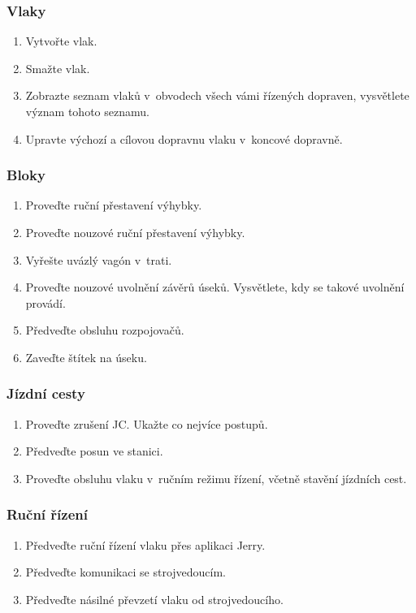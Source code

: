 \documentclass[12pt,a4paper]{article}
\def\solution#1{\ifsolution \par\vskip-\parskip{\color{gray}#1}\fi}
\begin{document}
\subsubsection*{Vlaky}
\begin{enumerate}[leftmargin=*]
\item Vytvořte vlak.
\item Smažte vlak.
\item Zobrazte seznam vlaků v~obvodech všech vámi řízených dopraven, vysvětlete
význam tohoto seznamu.
\item Upravte výchozí a cílovou dopravnu vlaku v~koncové dopravně.
\end{enumerate}

\subsubsection*{Bloky}
\begin{enumerate}[leftmargin=*]
\item Proveďte ruční přestavení výhybky.
\item Proveďte nouzové ruční přestavení výhybky.
\item Vyřešte uvázlý vagón v~trati.
\item Proveďte nouzové uvolnění závěrů úseků. Vysvětlete, kdy se takové uvolnění
provádí.
\item Předveďte obsluhu rozpojovačů.
\item Zaveďte štítek na úseku.
\end{enumerate}

\subsubsection*{Jízdní cesty}
\begin{enumerate}[leftmargin=*]
\item Proveďte zrušení JC. Ukažte co nejvíce postupů.

\item Předveďte posun ve stanici.

\item Proveďte obsluhu vlaku v~ručním režimu řízení, včetně stavění jízdních
cest.
\end{enumerate}

\subsubsection*{Ruční řízení}
\begin{enumerate}[leftmargin=*]
\item Předveďte ruční řízení vlaku přes aplikaci Jerry.
\item Předveďte komunikaci se strojvedoucím.
\item Předveďte násilné převzetí vlaku od strojvedoucího.
\end{enumerate}
\end{document}

